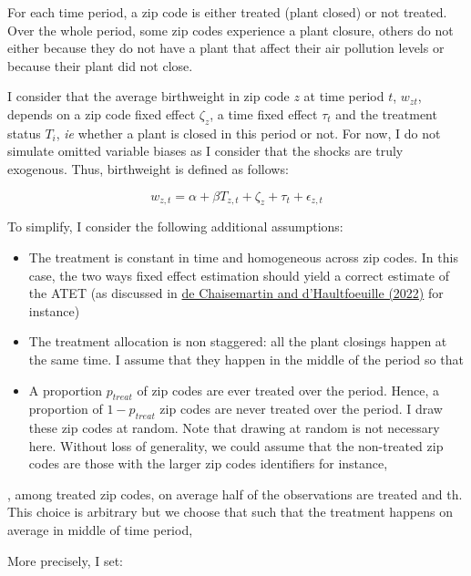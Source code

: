 \documentclass[
]{article}
\providecommand{\tightlist}{%
  \setlength{\itemsep}{0pt}\setlength{\parskip}{0pt}}
\begin{document}
For each time period, a zip code is either treated (plant closed) or not
treated. Over the whole period, some zip codes experience a plant
closure, others do not either because they do not have a plant that
affect their air pollution levels or because their plant did not close.

I consider that the average birthweight in zip code \(z\) at time period
\(t\), \(w_{zt}\), depends on a zip code fixed effect \(\zeta_z\), a
time fixed effect \(\tau_t\) and the treatment status \(T_i\), \emph{ie}
whether a plant is closed in this period or not. For now, I do not
simulate omitted variable biases as I consider that the shocks are truly
exogenous. Thus, birthweight is defined as follows:

\[w_{z,t} = \alpha + \beta T_{z, t} + \zeta_z + \tau_t + \epsilon_{z,t}\]

To simplify, I consider the following additional assumptions:

\begin{itemize}
\tightlist
\item
  The treatment is constant in time and homogeneous across zip codes. In
  this case, the two ways fixed effect estimation should yield a correct
  estimate of the ATET (as discussed in
  \href{https://www.nber.org/papers/w29691}{de Chaisemartin and
  d'Haultfoeuille (2022)} for instance)
\item
  The treatment allocation is non staggered: all the plant closings
  happen at the same time. I assume that they happen in the middle of
  the period so that
\item
  A proportion \(p_{treat}\) of zip codes are ever treated over the
  period. Hence, a proportion of \(1-p_{treat}\) zip codes are never
  treated over the period. I draw these zip codes at random. Note that
  drawing at random is not necessary here. Without loss of generality,
  we could assume that the non-treated zip codes are those with the
  larger zip codes identifiers for instance,
\end{itemize}

, among treated zip codes, on average half of the observations are
treated and th. This choice is arbitrary but we choose that such that
the treatment happens on average in middle of time period,

More precisely, I set:
\end{document}
